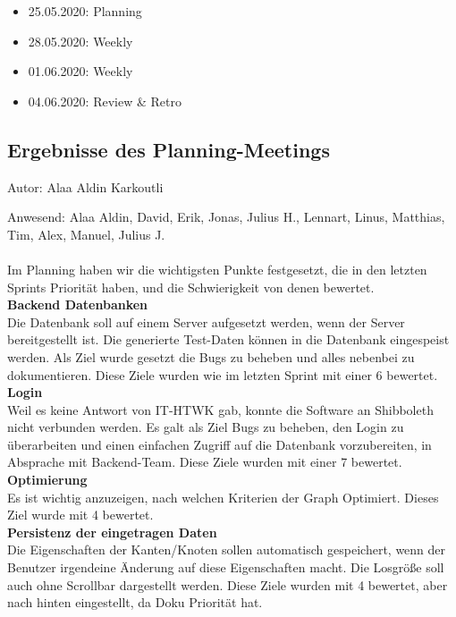 \begin{itemize}
\item 25.05.2020: Planning
\item 28.05.2020: Weekly
\item 01.06.2020: Weekly
\item 04.06.2020: Review \& Retro
\end{itemize}

\subsection{Ergebnisse des Planning-Meetings}
{\small Autor: Alaa Aldin Karkoutli}

Anwesend: Alaa Aldin, David, Erik, Jonas, Julius H., Lennart, Linus, Matthias, Tim, Alex, Manuel, Julius J.\\
\\
Im Planning haben wir die wichtigsten Punkte festgesetzt, die in den letzten Sprints Priorität haben, und die Schwierigkeit von denen bewertet.\\


\textbf{Backend Datenbanken}\\
Die Datenbank soll auf einem Server aufgesetzt werden, wenn der Server bereitgestellt ist.
Die generierte Test-Daten können in die Datenbank eingespeist werden. Als Ziel wurde gesetzt die Bugs zu beheben und alles nebenbei zu dokumentieren. 
Diese Ziele wurden wie im letzten Sprint mit einer 6 bewertet.\\

\textbf{Login}\\
Weil es keine Antwort von IT-HTWK gab, konnte die Software an Shibboleth nicht verbunden werden.
Es galt als Ziel Bugs zu beheben, den Login zu überarbeiten und einen einfachen Zugriff auf die Datenbank vorzubereiten, in Absprache mit Backend-Team.
Diese Ziele wurden mit einer 7 bewertet.\\

\textbf{Optimierung}\\
Es ist wichtig anzuzeigen, nach welchen Kriterien der Graph Optimiert.
Dieses Ziel wurde mit 4 bewertet.\\

\textbf{Persistenz der eingetragen Daten}\\
Die Eigenschaften der Kanten/Knoten sollen automatisch gespeichert, wenn der Benutzer irgendeine Änderung auf diese Eigenschaften macht.
Die Losgröße soll auch ohne Scrollbar dargestellt werden.
Diese Ziele wurden mit 4 bewertet, aber nach hinten eingestellt, da Doku Priorität hat. \\

